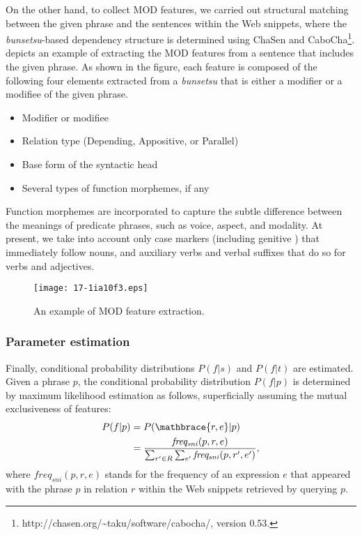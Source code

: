 \documentclass[english]{jnlp_1.4}
\begin{document}
On the other hand, to collect MOD features, we carried out structural
matching between the given phrase and the sentences within the Web
snippets, where the \textit{bunsetsu}-based dependency structure is
determined using ChaSen and
    CaboCha\footnote{http://chasen.org/\~{}taku/software/cabocha/,
  version 0.53.}.
 depicts an example of extracting the MOD features
from a sentence that includes the given phrase.  As shown in the
figure, each feature is composed of the following four elements
extracted from a \textit{bunsetsu} that is either a modifier or a
modifiee of the given phrase.
\begin{itemize}
\item Modifier or modifiee
\item Relation type (Depending, Appositive, or Parallel)
\item Base form of the syntactic head
\item Several types of function morphemes, if any
\end{itemize}
Function morphemes are incorporated to capture the subtle difference
between the meanings of predicate phrases, such as voice, aspect, and
modality.  At present, we take into account only case markers
(including genitive ) that immediately follow nouns, and
auxiliary verbs and verbal suffixes that do so for verbs and
adjectives.

\begin{figure}[t]
\begin{center}
\texttt{[image: 17-1ia10f3.eps]}
\end{center}
\caption{An example of MOD feature extraction.}
\label{fig:extract_mod}
\end{figure}

\subsubsection{Parameter estimation}
\label{sssec:parameter}

Finally, conditional probability distributions $P(f|s)$ and $P(f|t)$
are estimated.  Given a phrase $p$, the conditional probability
distribution $P(f|p)$ is determined by maximum likelihood estimation
as follows, superficially assuming the mutual exclusiveness of
features:
\begin{align*}
 P(f|p) & = P(\mathbrace{r,e}|p)\\
	& = \frac{\mathit{freq_{sni}}(p,r,e)}
	{\sum_{r'\in R}\sum_{e'}\mathit{freq_{sni}}(p,r',e')},
\end{align*}
where $\mathit{freq_{sni}}(p,r,e)$ stands for the frequency of an
expression $e$ that appeared with the phrase $p$ in relation $r$
within the Web snippets retrieved by querying $p$.
\end{document}

